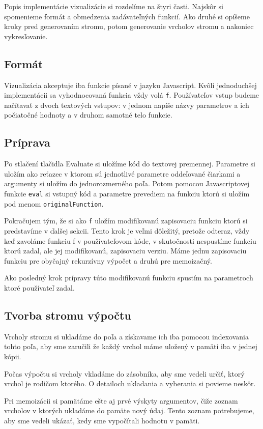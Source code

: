 Popis implementácie vizualizácie si rozdelíme na štyri časti. Najskôr si spomenieme
formát a obmedzenia zadávateľných funkcií. Ako druhé si opíšeme kroky
pred generovaním stromu, potom generovanie vrcholov stromu a nakoniec vykresľovanie.

\subsection{Formát}
Vizualizácia akceptuje iba funkcie písané v jazyku Javascript. Kvôli jednoduchšej implementácii
sa vyhodnocovaná funkcia vždy volá \lstinline[language=Javascript]{f}. Používateľov
vstup budeme načítavať z dvoch textových vstupov: v jednom napíše názvy parametrov
a ich počiatočné hodnoty a v druhom samotné telo funkcie.
\subsection{Príprava}
Po stlačení tlačidla Evaluate si uložíme kód do textovej premennej. Parametre si uložím
ako reťazec v ktorom sú jednotlivé parametre oddeľované čiarkami a argumenty si
uložím do jednorozmerného poľa. Potom pomocou Javascriptovej funkcie \lstinline[language=Javascript]{eval}
si vstupný kód a parametre prevediem na funkciu ktorú si uložím pod menom \lstinline[language=Javascript]{originalFunction}.

Pokračujem tým, že si ako \lstinline[language=Javascript]{f} uložím modifikovanú zapisovaciu funkciu
ktorú si predstavíme v ďalšej sekcii. Tento krok je veľmi dôležitý, pretože odteraz, vždy keď zavoláme funkciu
f v používateľovom kóde, v skutočnosti nespustíme funkciu ktorú zadal, ale jej modifikovanú,
zapisovaciu verziu. Máme jednu zapisovaciu funkciu pre obyčajný rekurzívny výpočet
a druhú pre memoizačný.

Ako posledný krok prípravy túto modifikovanú funkciu spustím
na parametroch ktoré používateľ zadal.

\subsection{Tvorba stromu výpočtu}
Vrcholy stromu si ukladáme do poľa a získavame ich iba pomocou indexovania tohto
poľa, aby sme zaručili že každý vrchol máme uložený v pamäti iba v jednej kópii.

Počas výpočtu si vrcholy vkladáme do zásobníka, aby sme vedeli určiť, ktorý vrchol
je rodičom ktorého. O detailoch ukladania a vyberania si povieme neskôr.

Pri memoizácii si pamätáme ešte aj prvé výskyty argumentov, čiže zoznam vrcholov
v ktorých ukladáme do pamäte nový údaj. Tento zoznam potrebujeme, aby sme vedeli
ukázať, kedy sme vypočítali hodnotu v pamäti.

